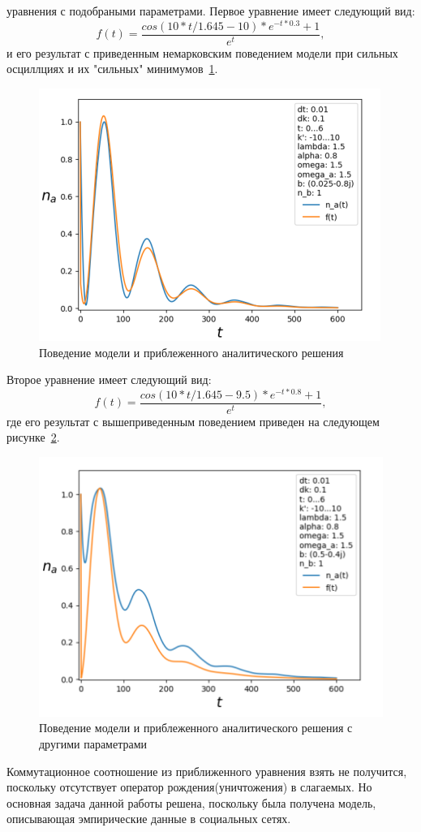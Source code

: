 уравнения с подобраными параметрами.
Первое уравнение имеет следующий вид:
\begin{equation}
    f(t) = \frac{cos(10*t/1.645 - 10)*e^{-t*0.3} + 1}{e^{t}},
\end{equation}
и его результат с приведенным немарковским поведением модели при сильных осциллциях и их "сильных" минимумов~\ref{fig:sr_proba_1}.
\begin{figure}[h!]
    \centering
    \captionsetup{justification=centering}
    \includegraphics[width=0.7\linewidth]{pictures/result_second_5.png}
    \caption{Поведение модели и приблеженного аналитического решения}
    \label{fig:sr_proba_1}
\end{figure}
Второе уравнение имеет следующий вид:
\begin{equation}
    f(t) = \frac{cos(10*t/1.645 - 9.5)*e^{-t*0.8} + 1}{e^{t}},
\end{equation}
где его результат с вышеприведенным поведением приведен на следующем рисунке~\ref{fig:sr_proba_2}.
\newpage
\begin{figure}[h!]
    \centering
    \captionsetup{justification=centering}
    \includegraphics[width=0.7\linewidth]{pictures/result_second_6.png}
    \caption{Поведение модели и приблеженного аналитического решения с другими параметрами}
    \label{fig:sr_proba_2}
\end{figure}

Коммутационное соотношение из приближенного уравнения взять не получится, поскольку отсутствует
оператор рождения(уничтожения) в слагаемых.
Но основная задача данной работы решена, поскольку была получена модель, описывающая эмпирические
данные в социальных сетях.